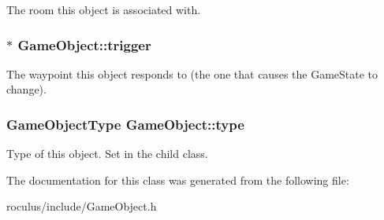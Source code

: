 \-The room this object is associated with. \hypertarget{classGameObject_ace2db5f1940d0489b8766a77f0832069}{
\subsubsection[{trigger}]{$\ast$ {\bf \-Game\-Object\-::trigger}}}\label{classGameObject_ace2db5f1940d0489b8766a77f0832069}
\-The waypoint this object responds to (the one that causes the \-Game\-State to change). \hypertarget{classGameObject_a6f5c85c8b3a4cb373efb1faa229fc9f3}{
\subsubsection[{type}]{\setlength{\rightskip}{0pt plus 5cm}\-Game\-Object\-Type {\bf \-Game\-Object\-::type}}}\label{classGameObject_a6f5c85c8b3a4cb373efb1faa229fc9f3}
\-Type of this object. \-Set in the child class. 

\-The documentation for this class was generated from the following file\-:\begin{DoxyCompactItemize}
\item 
roculus/include/\-Game\-Object.\-h\end{DoxyCompactItemize}
